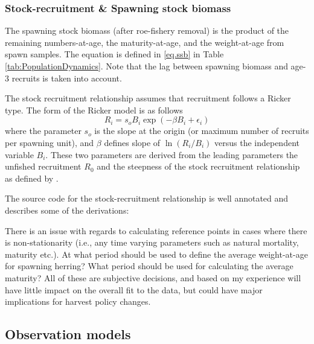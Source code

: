 \documentclass[12pt,letterpaper]{article}
\begin{document}
    \subsubsection{Stock-recruitment \& Spawning stock biomass} %
    \label{ssub:stock_recruitment_&_spawning_stock_biomass}
    The spawning stock biomass (after roe-fishery removal) is the product of the remaining numbers-at-age, the maturity-at-age, and the weight-at-age from spawn samples.  The equation is defined in \eqref{eq.ssb} in Table \ref{tab:PopulationDynamics}.  Note that the lag between spawning biomass and age-3 recruits is taken into account.

    The stock recruitment relationship assumes that recruitment follows a Ricker type.  The form  of the Ricker model is as follows \[ R_i = s_o B_i \exp(-\beta B_i + \epsilon_i)\] where the parameter $s_o$ is the slope at the origin (or maximum number of recruits per spawning unit), and $\beta$ defines slope of $\ln(R_i/B_i)$ versus the independent variable $B_i$.  These two parameters are derived from the leading parameters the unfished recruitment $R_0$ and the steepness of the stock recruitment relationship as defined by \citep{mace1988generalised}.

    The source code for the stock-recruitment relationship is well annotated and describes some of the derivations:
    
      

    There is an issue with regards to calculating reference points in cases where there is non-stationarity (i.e., any time varying parameters such as natural mortality, maturity etc.).  At what period should be used to define the average weight-at-age for spawning herring? What period should be used for calculating the average maturity?  All of these are subjective decisions, and based on my experience will have little impact on the overall fit to the data, but could have major implications for harvest policy changes. 


  \subsection{Observation models} %
  \label{sub:observation_models}
\end{document}
